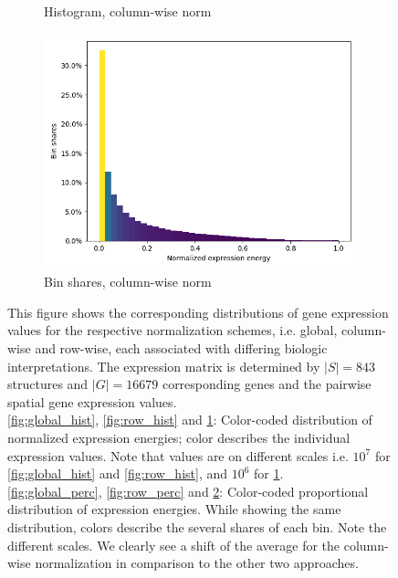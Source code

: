 \documentclass[]{article}
\begin{document}
\begin{figure}
\begin{subfigure}{.45\textwidth}
		\caption{Histogram, column-wise norm}
		\label{fig:col_hist}
	\end{subfigure}
	\begin{subfigure}{.45\textwidth}
		\centering
		\includegraphics[width=.9\linewidth]{plotted_figures/column_percent_ge_data_histo.png}
		\caption{Bin shares, column-wise norm}
		\label{fig:col_perc}
	\end{subfigure}


	\caption{This figure shows the corresponding distributions of gene expression values for the respective normalization schemes, i.e. global, column-wise and row-wise, each associated with differing biologic interpretations. The expression matrix is determined by $|S|=843$ structures and $|G|=16679$ corresponding genes and the pairwise spatial gene expression values.\\ \ref{fig:global_hist}, \ref{fig:row_hist} and \ref{fig:col_hist}: Color-coded distribution of normalized expression energies; color describes the individual expression values. Note that values are on different scales i.e. $10^7$ for \ref{fig:global_hist} and \ref{fig:row_hist}, and $10^6$ for \ref{fig:col_hist}.\\ 
	\ref{fig:global_perc}, \ref{fig:row_perc} and \ref{fig:col_perc}: 
	Color-coded proportional distribution of expression energies. While showing the same distribution, colors describe the several shares of each bin. Note the different scales. We clearly see a shift of the average for the column-wise normalization in comparison to the other two approaches.}
	\label{fig:ge_hists}
\end{figure}

\end{document}
